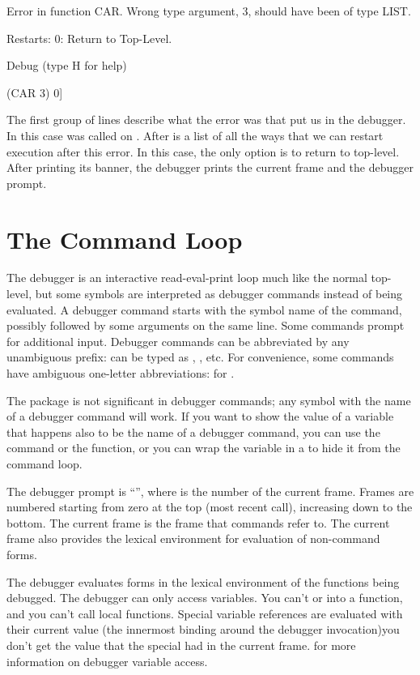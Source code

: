 \begin{example}
Error in function CAR.
Wrong type argument, 3, should have been of type LIST.

Restarts:
  0: Return to Top-Level.

Debug  (type H for help)

(CAR 3)
0]
\end{example}

The first group of lines describe what the error was that put us in the
debugger.  In this case  was called on .  After 
is a list of all the ways that we can restart execution after this error.  In
this case, the only option is to return to top-level.  After printing its
banner, the debugger prints the current frame and the debugger prompt.


\section{The Command Loop}

The debugger is an interactive read-eval-print loop much like the normal
top-level, but some symbols are interpreted as debugger commands instead
of being evaluated.  A debugger command starts with the symbol name of
the command, possibly followed by some arguments on the same line.  Some
commands prompt for additional input.  Debugger commands can be
abbreviated by any unambiguous prefix:  can be typed as
, , etc.  For convenience, some commands have
ambiguous one-letter abbreviations:  for .

The package is not significant in debugger commands; any symbol with the
name of a debugger command will work.  If you want to show the value of
a variable that happens also to be the name of a debugger command, you
can use the  command or the 
function, or you can wrap the variable in a  to hide it from
the command loop.

The debugger prompt is ``\code{]}'', where  is the number
of the current frame.  Frames are numbered starting from zero at the top (most
recent call), increasing down to the bottom.  The current frame is the frame
that commands refer to.  The current frame also provides the lexical
environment for evaluation of non-command forms.

 The debugger evaluates forms in the lexical
environment of the functions being debugged.  The debugger can only
access variables.  You can't  or  into a
function, and you can't call local functions.  Special variable
references are evaluated with their current value (the innermost binding
around the debugger invocation)\dash{}you don't get the value that the
special had in the current frame.   for more
information on debugger variable access.


